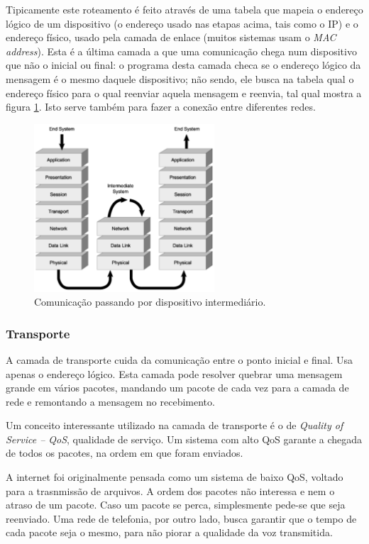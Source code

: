 Tipicamente este roteamento é feito através de uma tabela que mapeia o endereço lógico de um dispositivo (o endereço usado nas etapas acima, tais como o IP) e o endereço físico, usado pela camada de enlace (muitos sistemas usam o \emph{MAC address}). Esta é a última camada a que uma comunicação chega num dispositivo que não o inicial ou final: o programa desta camada checa se o endereço lógico da mensagem é o mesmo daquele dispositivo; não sendo, ele busca na tabela qual o endereço físico para o qual reenviar aquela mensagem e reenvia, tal qual mostra a figura \ref{fig:camada_rede}. Isto serve também para fazer a conexão entre diferentes redes.

\begin{figure}[hbt]
	\begin{center}
		\includegraphics[width=0.6\textwidth]{figuras/network_layer}
	\end{center}
	\caption{Comunicação passando por dispositivo intermediário.}
	\label{fig:camada_rede}
\end{figure}

\subsubsection{Transporte}
 A camada de transporte cuida da comunicação entre o ponto inicial e final. Usa apenas o endereço lógico.
 Esta camada pode resolver quebrar uma mensagem grande em vários pacotes, mandando um pacote de cada vez para a camada de rede e remontando a mensagem no recebimento.

 Um conceito interessante utilizado na camada de transporte é o de \emph{Quality of Service -- QoS}, qualidade de serviço. Um sistema com alto QoS garante a chegada de todos os pacotes, na ordem em que foram enviados.

 A internet foi originalmente pensada como um sistema de baixo QoS, voltado para a trasnmissão de arquivos. A ordem dos pacotes não interessa e nem o atraso de um pacote. Caso um pacote se perca, simplesmente pede-se que seja reenviado. Uma rede de telefonia, por outro lado, busca garantir que o tempo de cada pacote seja o mesmo, para não piorar a qualidade da voz transmitida.

